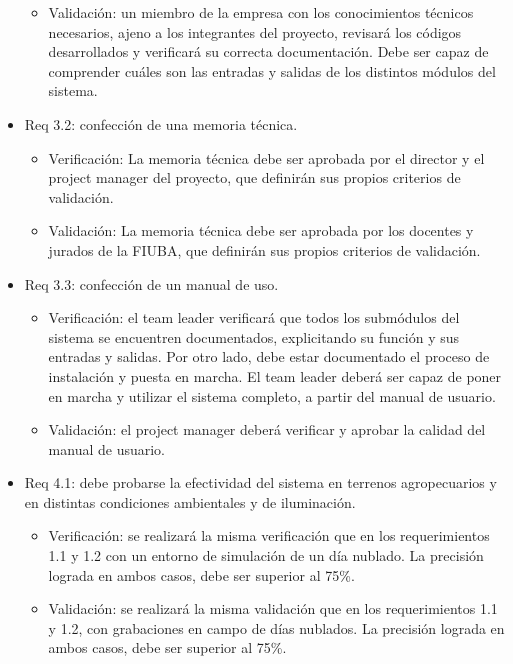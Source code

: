 \documentclass[
11pt, %
codirector, %
]{charter}
\begin{document}
\begin{itemize}
\begin{itemize}
		\item Validación: un miembro de la empresa con los conocimientos técnicos necesarios, ajeno a los integrantes del proyecto, revisará los códigos desarrollados y verificará su correcta documentación. Debe ser capaz de comprender cuáles son las entradas y salidas de los distintos módulos del sistema.
	\end{itemize}
	\item Req 3.2: confección de una memoria técnica.
	\begin{itemize}
		\item Verificación: La memoria técnica debe ser aprobada por el director y el project manager del proyecto, que definirán sus propios criterios de validación. 
		\item Validación: La memoria técnica debe ser aprobada por los docentes y jurados de la FIUBA, que definirán sus propios criterios de validación.
	\end{itemize}
	\item Req 3.3: confección de un manual de uso.
	\begin{itemize}
		\item Verificación: el team leader verificará que todos los submódulos del sistema se encuentren documentados, explicitando su función y sus entradas y salidas. Por otro lado, debe estar documentado el proceso de instalación y puesta en marcha. El team leader deberá ser capaz de poner en marcha y utilizar el sistema completo, a partir del manual de usuario.
		\item Validación: el project manager deberá verificar y aprobar la calidad del manual de usuario.
	\end{itemize}
	\item Req 4.1: debe probarse la efectividad del sistema en terrenos agropecuarios y en distintas condiciones ambientales y de iluminación.
	\begin{itemize}
		\item Verificación: se realizará la misma verificación que en los requerimientos 1.1 y 1.2 con un entorno de simulación de un día nublado. La precisión lograda en ambos casos, debe ser superior al 75\%. 
		\item Validación: se realizará la misma validación que en los requerimientos 1.1 y 1.2, con grabaciones en campo de días nublados. La precisión lograda en ambos casos, debe ser superior al 75\%.
	\end{itemize}
\end{itemize} 
\end{document}

